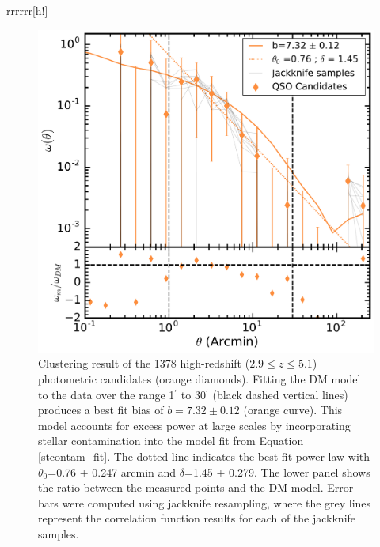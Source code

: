 \documentclass[apj, numberedappendix]{emulateapj}
\begin{document}
\begin{deluxetable}{rrrrrr}[h!]
\tablewidth{0pt}
\startdata
\label{tab:Counts}
\enddata
{}
\end{deluxetable}

\begin{figure}[ht!]
\centering
\includegraphics[scale = 0.35]{./New_Plots/SpIES_corrfunc_only.pdf}
\caption{\footnotesize{Clustering result of the 1378 high-redshift ($2.9 \leq z \leq 5.1$) photometric candidates (orange diamonds). Fitting the DM model to the data over the range 1$^{\prime}$ to 30$^{\prime}$ (black dashed vertical lines) produces a best fit bias of $b = 7.32 \pm 0.12$ (orange curve). This model accounts for excess power at large scales by incorporating stellar contamination into the model fit from Equation \ref{stcontam_fit}. The dotted line indicates the best fit power-law with $\theta_0$=0.76 $\pm$ 0.247 arcmin and $\delta$=1.45 $\pm$ 0.279. The lower panel shows the ratio between the measured points and the DM model. Error bars were computed using jackknife resampling, where the grey lines represent the correlation function results for each of the jackknife samples.}}
\label{fig:full_corr}
\end{figure}
\end{document}

